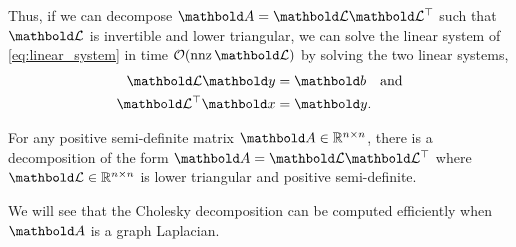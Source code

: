 Thus, if we can decompose $\mA = \mCalL\trans{\mCalL}$ such that $\mCalL$ is invertible and lower triangular, we can solve the linear system of \cref{eq:linear_system} in time $\LandauO{\nnz{\mCalL}}$ by solving the two linear systems, \begin{align}
    \mCalL\vy &= \vb \quad\text{and} \\
    \trans{\mCalL}\vx &= \vy.
\end{align}

\begin{lem} For any positive semi-definite matrix $\mA \in \R^{n \times n}$, there is a decomposition of the form $\mA = \mCalL\trans{\mCalL}$ where $\mCalL \in \R^{n \times n}$ is lower triangular and positive semi-definite.
\end{lem}

We will see that the Cholesky decomposition can be computed efficiently when $\mA$ is a graph Laplacian.